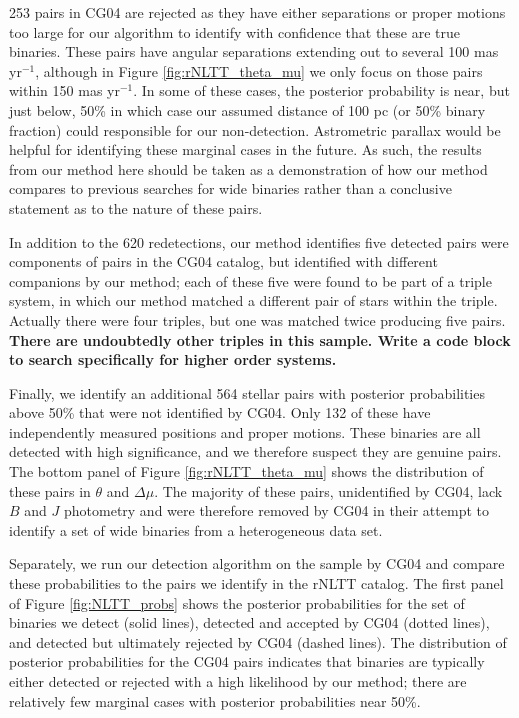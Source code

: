 \documentclass[usenatbib]{mnras}
\begin{document}
253 pairs in CG04 are rejected as they have either separations or proper motions too large for our algorithm to identify with confidence that these are true binaries. These pairs have angular separations extending out to several 100 mas yr$^{-1}$, although in Figure \ref{fig:rNLTT_theta_mu} we only focus on those pairs within 150 mas yr$^{-1}$. In some of these cases, the posterior probability is near, but just below, 50\% in which case our assumed distance of 100 pc (or 50\% binary fraction) could responsible for our non-detection. Astrometric parallax would be helpful for identifying these marginal cases in the future. As such, the results from our method here should be taken as a demonstration of how our method compares to previous searches for wide binaries rather than a conclusive statement as to the nature of these pairs.



In addition to the 620 redetections, our method identifies five detected pairs were components of pairs in the CG04 catalog, but identified with different companions by our method; each of these five were found to be part of a triple system, in which our method matched a different pair of stars within the triple. Actually there were four triples, but one was matched twice producing five pairs. {\bf There are undoubtedly other triples in this sample. Write a code block to search specifically for higher order systems.}


Finally, we identify an additional 564 stellar pairs with posterior probabilities above 50\% that were not identified by CG04. Only 132 of these have independently measured positions and proper motions. These binaries are all detected with high significance, and we therefore suspect they are genuine pairs. The bottom panel of Figure \ref{fig:rNLTT_theta_mu} shows the distribution of these pairs in $\theta$ and $\Delta \mu$. The majority of these pairs, unidentified by CG04, lack $B$ and $J$ photometry and were therefore removed by CG04 in their attempt to identify a set of wide binaries from a heterogeneous data set.





Separately, we run our detection algorithm on the sample by CG04 and compare these probabilities to the pairs we identify in the rNLTT catalog. The first panel of Figure \ref{fig:NLTT_probs} shows the posterior probabilities for the set of binaries we detect (solid lines), detected and accepted by CG04 (dotted lines), and detected but ultimately rejected by CG04 (dashed lines). The distribution of posterior probabilities for the CG04 pairs indicates that binaries are typically either detected or rejected with a high likelihood by our method; there are relatively few marginal cases with posterior probabilities near 50\%.
\end{document}
